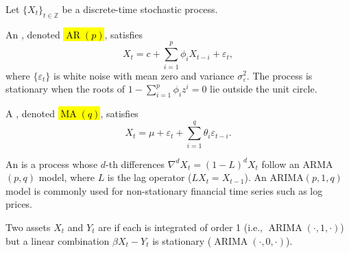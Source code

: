 \begin{definition} \label{definition:arima_models_for_time_series_data}
Let $\{X_t\}_{t \in \mathbb{Z}}$ be a discrete-time stochastic process.

An , denoted \hl{$\operatorname{AR}(p)$}, satisfies
$$X_t = c + \sum_{i=1}^p \phi_i X_{t-i} + \varepsilon_t,$$
where $\{\varepsilon_t\}$ is white noise with mean zero and variance $\sigma_\varepsilon^2$. The process is stationary when the roots of $1 - \sum_{i=1}^p \phi_i z^i = 0$ lie outside the unit circle.

A , denoted \hl{$\operatorname{MA}(q)$}, satisfies
$$X_t = \mu + \varepsilon_t + \sum_{i=1}^q \theta_i \varepsilon_{t-i}.$$

An  is a process whose $d$-th differences $\nabla^d X_t = (1 - L)^d X_t$ follow an ARMA$(p, q)$ model, where $L$ is the lag operator ($L X_t = X_{t-1}$). An ARIMA$(p, 1, q)$ model is commonly used for non-stationary financial time series such as log prices.

Two assets $X_t$ and $Y_t$ are  if each is integrated of order 1 (i.e., $\operatorname{ARIMA}(\cdot, 1, \cdot)$) but a linear combination $\beta X_t - Y_t$ is stationary ($\operatorname{ARIMA}(\cdot, 0, \cdot)$).
\end{definition}